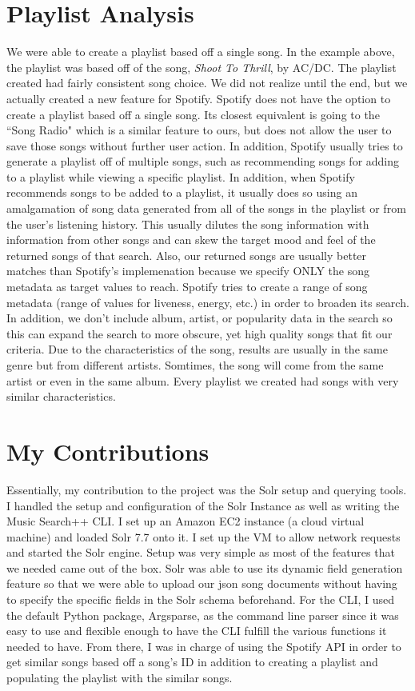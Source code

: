 \documentclass [letter,12pt] {article}
\begin{document}
\section{Playlist Analysis}
    We were able to create a playlist based off a single song. In the example above, the playlist was based off of the song, \textit{Shoot To Thrill}, by AC/DC. The playlist created had fairly consistent song choice. We did not realize until the end, but we actually created a new feature for Spotify. Spotify does not have the option to create a playlist based off a single song. Its closest equivalent is going to the ``Song Radio" which is  a similar feature to ours, but does not allow the user to save those songs without further user action. In addition, Spotify usually tries to generate a playlist off of multiple songs, such as recommending songs for adding to a playlist while viewing a specific playlist. In addition, when Spotify recommends songs to be added to a playlist, it usually does so using an amalgamation of song data generated from all of the songs in the playlist or from the user's listening history. This usually dilutes the song information with information from other songs and can skew the target mood and feel of the returned songs of that search. Also, our returned songs are usually better matches than Spotify's implemenation because we specify ONLY the song metadata as target values to reach. Spotify tries to create a range of song metadata (range of values for liveness, energy, etc.) in order to broaden its search. In addition, we don't include album, artist, or popularity data in the search so this can expand the search to more obscure, yet high quality songs that fit our criteria. Due to the characteristics of the song, results are usually in the same genre but from different artists. Somtimes, the song will come from the same artist or even in the same album. Every playlist we created had songs with very similar characteristics.

\section{My Contributions}
    Essentially, my contribution to the project was the Solr setup and querying tools. I handled the setup and configuration of the Solr Instance as well as writing the Music Search++ CLI. I set up an Amazon EC2 instance (a cloud virtual machine) and loaded Solr 7.7 onto it. I set up the VM to allow network requests and started the Solr engine. Setup was very simple as most of the features that we needed came out of the box. Solr was able to use its dynamic field generation feature so that we were able to upload our json song documents without having to specify the specific fields in the Solr schema beforehand. For the CLI, I used the default Python package, Argsparse, as the command line parser since it was easy to use and flexible enough to have the CLI fulfill the various functions it needed to have. From there, I was in charge of using the Spotify API in order to get similar songs based off a song's ID in addition to creating a playlist and populating the playlist with the similar songs. 
\end{document}
